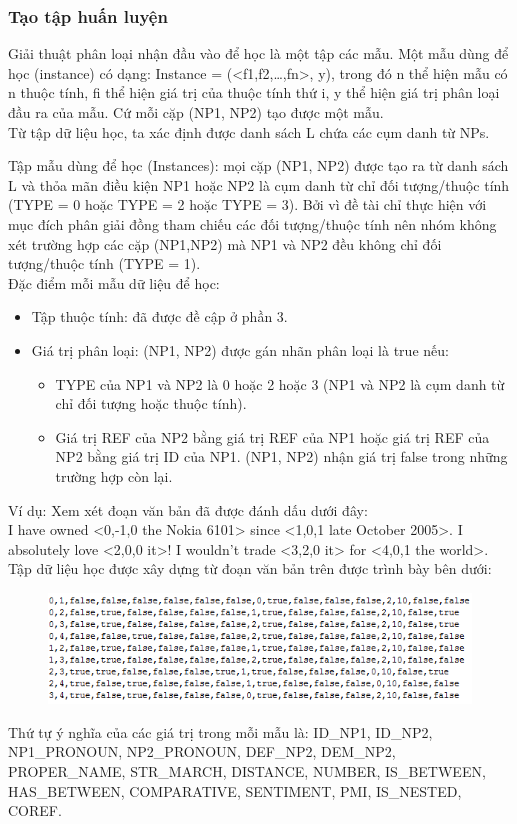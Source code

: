 \documentclass[12pt]{extarticle}
\begin{document}
			\subsubsection*{Tạo tập huấn luyện}
				\par Giải thuật phân loại nhận đầu vào để học là một tập các mẫu. Một mẫu dùng để học (instance) có dạng: Instance = (<f1,f2,…,fn>, y), trong đó n thể hiện mẫu có n thuộc tính, fi thể hiện giá trị của thuộc tính thứ i, y thể hiện giá trị phân loại đầu ra của mẫu. Cứ mỗi cặp (NP1, NP2) tạo được một mẫu. 
				\\Từ tập dữ liệu học, ta xác định được danh sách L chứa các cụm danh từ NPs.
				\par Tập mẫu dùng để học (Instances): mọi cặp (NP1, NP2) được tạo ra từ danh sách L và thỏa mãn điều kiện NP1 hoặc NP2 là cụm danh từ chỉ đối tượng/thuộc tính (TYPE = 0 hoặc TYPE = 2 hoặc TYPE = 3). Bởi vì đề tài chỉ thực hiện với mục đích phân giải đồng tham chiếu các đối tượng/thuộc tính nên nhóm không xét trường hợp các cặp (NP1,NP2) mà NP1 và NP2 đều không chỉ đối tượng/thuộc tính (TYPE = 1).
				\\Đặc điểm mỗi mẫu dữ liệu để học:
				\begin{itemize}
					\item{Tập thuộc tính: đã được đề cập ở phần 3.}
					\item{Giá trị phân loại: (NP1, NP2) được gán nhãn phân loại là true nếu:
						\begin{itemize}
							\item{TYPE của NP1 và NP2 là 0 hoặc 2 hoặc 3 (NP1 và NP2 là cụm danh từ chỉ đối tượng hoặc thuộc tính).}
							\item{Giá trị REF của NP2 bằng giá trị REF của NP1 hoặc giá trị REF của NP2 bằng giá trị ID của NP1. (NP1, NP2) nhận giá trị false trong những trường hợp còn lại.}
						\end{itemize}}
				\end{itemize}
				\par Ví dụ: Xem xét đoạn văn bản đã được đánh dấu dưới đây:
				\\I have owned <0,-1,0 the Nokia 6101> since <1,0,1 late October 2005>. I absolutely love <2,0,0 it>! I wouldn't trade <3,2,0 it> for <4,0,1 the world>.
				\\Tập dữ liệu học được xây dựng từ đoạn văn bản trên được trình bày bên dưới:
				\begin{figure}[H] 
					\centering
					\includegraphics{images/examples_train.png}
				\end{figure} 
				\par Thứ tự ý nghĩa của các giá trị trong mỗi mẫu là: ID\_NP1, ID\_NP2, NP1\_PRONOUN, NP2\_PRONOUN, DEF\_NP2, DEM\_NP2, PROPER\_NAME, STR\_MARCH, DISTANCE, NUMBER, IS\_BETWEEN, HAS\_BETWEEN, COMPARATIVE, SENTIMENT, PMI, IS\_NESTED, COREF.
\end{document}
